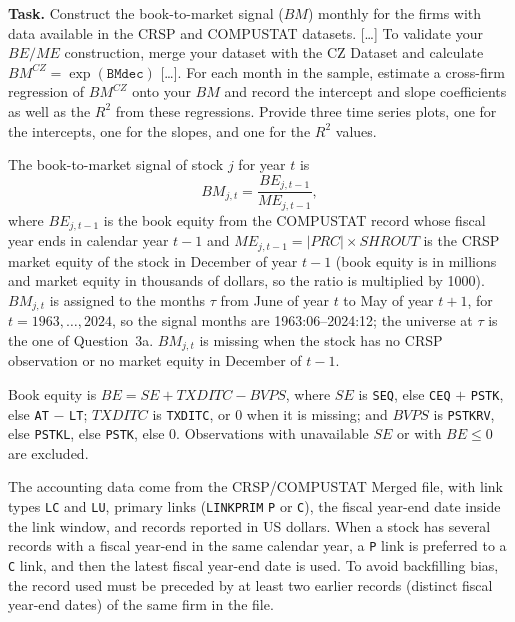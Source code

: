 \documentclass[11pt]{article}
\makeatletter
\newcommand{\BM}{\mathit{BM}}
\newcommand{\task}[1]{\par\if@nobreak\else\needspace{5\baselineskip}\fi\medskip\noindent
  \begin{minipage}{\linewidth}\textbf{Task.} #1\end{minipage}\par   %
  \nopagebreak\medskip\@afterheading}   %
\makeatother
\begin{document}
\task{Construct the book-to-market signal ($\BM$) monthly for the firms with data available in the
CRSP and COMPUSTAT datasets. [\dots] To validate your $\mathit{BE}/\mathit{ME}$ construction,
merge your dataset with the CZ Dataset and calculate $\BM^{CZ} = \exp(\texttt{BMdec})$
[\dots]. For each month in the sample, estimate a cross-firm regression of $\BM^{CZ}$ onto your
$\BM$ and record the intercept and slope coefficients as well as the $R^2$ from these
regressions. Provide three time series plots, one for the intercepts, one for the slopes, and
one for the $R^2$ values.}

The book-to-market signal of stock $j$ for year $t$ is
\begin{equation}
  \BM_{j,t} = \frac{\mathit{BE}_{j,t-1}}{\mathit{ME}_{j,t-1}},
  \label{eq:q3b_bm}
\end{equation}
where $\mathit{BE}_{j,t-1}$ is the book equity from the COMPUSTAT record whose fiscal year
ends in calendar year $t-1$ and $\mathit{ME}_{j,t-1} = |\mathit{PRC}| \times \mathit{SHROUT}$
is the CRSP market equity of the stock in December of year $t-1$ (book equity is in millions
and market equity in thousands of dollars, so the ratio is multiplied by 1000).
$\BM_{j,t}$ is assigned to the months $\tau$ from June of year $t$ to May of year $t+1$, for
$t = 1963, \dots, 2024$, so the signal months are 1963:06--2024:12; the universe at $\tau$ is
the one of Question~3a. $\BM_{j,t}$ is missing when the stock has no CRSP observation or no
market equity in December of $t-1$.

Book equity is $\mathit{BE} = \mathit{SE} + \mathit{TXDITC} - \mathit{BVPS}$, where
$\mathit{SE}$ is \texttt{SEQ}, else \texttt{CEQ} $+$ \texttt{PSTK}, else \texttt{AT} $-$
\texttt{LT}; $\mathit{TXDITC}$ is \texttt{TXDITC}, or 0 when it is missing; and
$\mathit{BVPS}$ is \texttt{PSTKRV}, else \texttt{PSTKL}, else \texttt{PSTK}, else 0.
Observations with unavailable $\mathit{SE}$ or with $\mathit{BE} \le 0$ are excluded.

The accounting data come from the CRSP/COMPUSTAT Merged file, with link types \texttt{LC}
and \texttt{LU}, primary links (\texttt{LINKPRIM} \texttt{P} or \texttt{C}), the fiscal
year-end date inside the link window, and records reported in US dollars. When a stock has
several records with a fiscal year-end in the same calendar year, a \texttt{P} link is
preferred to a \texttt{C} link, and then the latest fiscal year-end date is used. To avoid
backfilling bias, the record used must be preceded by at least two earlier records
(distinct fiscal year-end dates) of the same firm in the file.
\end{document}
